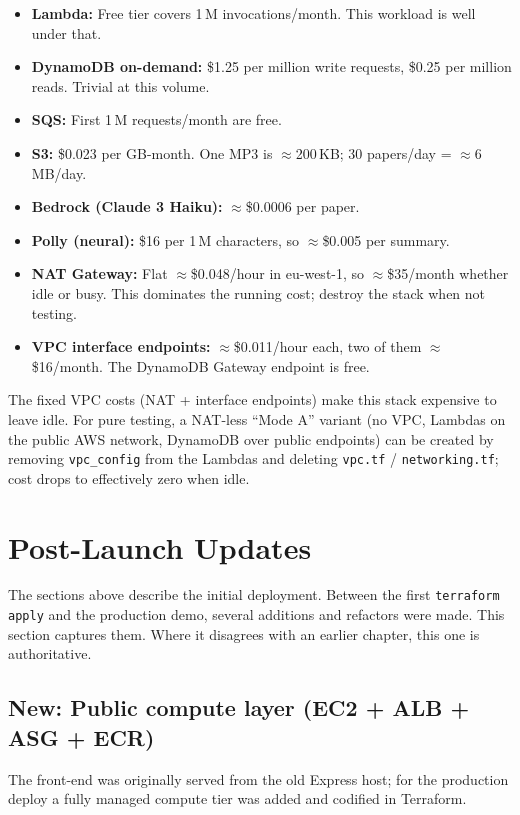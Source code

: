 \documentclass[11pt,a4paper]{article}
\begin{document}
\begin{itemize}[leftmargin=*]
  \item \textbf{Lambda:} Free tier covers 1\,M invocations/month. This workload is well under that.
  \item \textbf{DynamoDB on-demand:} \$1.25 per million write requests, \$0.25 per million reads. Trivial at this volume.
  \item \textbf{SQS:} First 1\,M requests/month are free.
  \item \textbf{S3:} \$0.023 per GB-month. One MP3 is ${\approx}$200\,KB; 30 papers/day = ${\approx}$6\,MB/day.
  \item \textbf{Bedrock (Claude 3 Haiku):} ${\approx}$\$0.0006 per paper.
  \item \textbf{Polly (neural):} \$16 per 1\,M characters, so ${\approx}$\$0.005 per summary.
  \item \textbf{NAT Gateway:} Flat ${\approx}$\$0.048/hour in eu-west-1, so ${\approx}$\$35/month whether idle or busy. This dominates the running cost; destroy the stack when not testing.
  \item \textbf{VPC interface endpoints:} ${\approx}$\$0.011/hour each, two of them ${\approx}$\$16/month. The DynamoDB Gateway endpoint is free.
\end{itemize}

The fixed VPC costs (NAT + interface endpoints) make this stack expensive to leave idle. For pure testing, a NAT-less ``Mode A'' variant (no VPC, Lambdas on the public AWS network, DynamoDB over public endpoints) can be created by removing \texttt{vpc\_config} from the Lambdas and deleting \texttt{vpc.tf} / \texttt{networking.tf}; cost drops to effectively zero when idle.

\section{Post-Launch Updates}

The sections above describe the initial deployment. Between the first
\texttt{terraform apply} and the production demo, several additions and
refactors were made. This section captures them. Where it disagrees with
an earlier chapter, this one is authoritative.

\subsection{New: Public compute layer (EC2 + ALB + ASG + ECR)}

The front-end was originally served from the old Express host; for the
production deploy a fully managed compute tier was added and codified in
Terraform.
\end{document}
